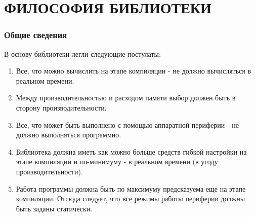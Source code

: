 \chapter{ФИЛОСОФИЯ БИБЛИОТЕКИ}
\subsection{Общие сведения}
В основу библиотеки легли следующие постулаты:
\begin{enumerate}
	\item Все, что можно вычислить на этапе компиляции - не должно вычисляться в реальном времени. 
	\item Между производительностью и расходом памяти выбор должен быть в сторону производительности.
	\item Все, что может быть выполнено с помощью аппаратной периферии - не должно выполняться программно.
	\item Библиотека должна иметь как можно больше средств гибкой настройки на этапе компиляции и по-минимуму - в реальном времени (в угоду производительности).
	\item Работа программы должна быть по максимуму предсказуема еще на этапе компиляции. Отсюда следует, что все режимы работы периферии должны быть заданы статически.
\end{enumerate}

